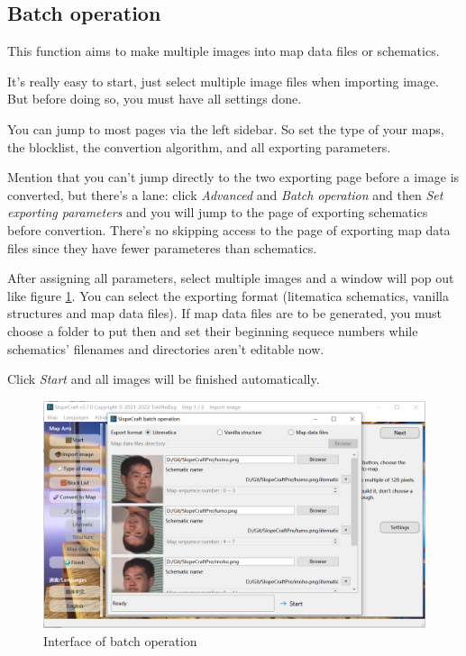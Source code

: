 \documentclass{article}
\begin{document}
   \subsection{Batch operation}
   \label{BatchOp}
   This function aims to make multiple images into map data files or schematics.

   It's really easy to start, just select multiple image files when importing image. But before doing so, you must have all settings done.

   You can jump to most pages via the left sidebar. So set the type of your maps, the blocklist, the convertion algorithm, and all exporting parameters. 
   
   Mention that you can't jump directly to the two exporting page before a image is converted, but there's a lane: click \textit{Advanced} and \textit{Batch operation} and then \textit{Set exporting parameters} and you will jump to the page of exporting schematics before convertion. There's no skipping access to the page of exporting map data files since they have fewer parameteres than schematics.

   After assigning all parameters, select multiple images and a window will pop out like figure \ref*{BatchUi}. You can select the exporting format (litematica schematics, vanilla structures and map data files). If map data files are to be generated, you must choose a folder to put then and set their beginning sequece numbers while schematics' filenames and directories aren't editable now.

   Click \textit{Start} and all images will be finished automatically.

   \begin{figure}[htbp]
       \centering
       \includegraphics[width=15cm]{Img11_BatchOp.png}
       \caption{Interface of batch operation}
       \label{BatchUi}
   \end{figure}
   
\end{document}
